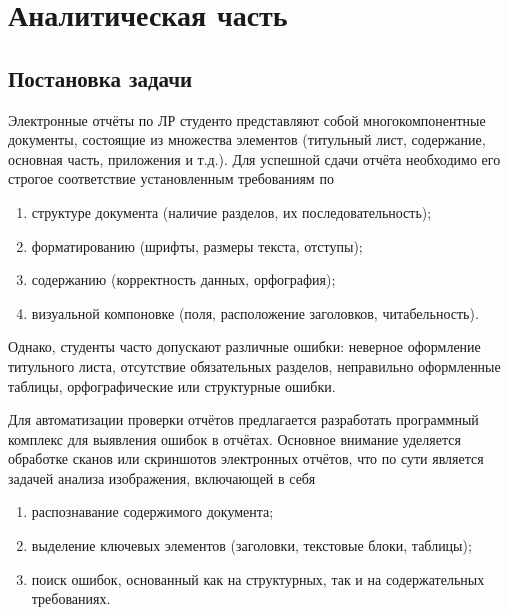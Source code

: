 \chapter{Аналитическая часть}



\section{Постановка задачи}

Электронные отчёты по ЛР студенто представляют собой многокомпонентные документы, состоящие из множества элементов (титульный лист, содержание, основная часть, приложения и т.д.). Для успешной сдачи отчёта необходимо его строгое соответствие установленным требованиям по
\begin{enumerate}[label*=---]
	\item структуре документа (наличие разделов, их последовательность);
	\item форматированию (шрифты, размеры текста, отступы);
	\item содержанию (корректность данных, орфография);
	\item визуальной компоновке (поля, расположение заголовков, читабельность).
\end{enumerate}

Однако, студенты часто допускают различные ошибки: неверное оформление титульного листа, отсутствие обязательных разделов, неправильно оформленные таблицы, орфографические или структурные ошибки.

Для автоматизации проверки отчётов предлагается разработать программный комплекс для выявления ошибок в отчётах. Основное внимание уделяется обработке сканов или скриншотов электронных отчётов, что по сути является задачей анализа изображения, включающей в себя
\begin{enumerate}[label*=---]
	\item распознавание содержимого документа;
	\item выделение ключевых элементов (заголовки, текстовые блоки, таблицы);
	\item поиск ошибок, основанный как на структурных, так и на содержательных требованиях.
\end{enumerate}


\clearpage
